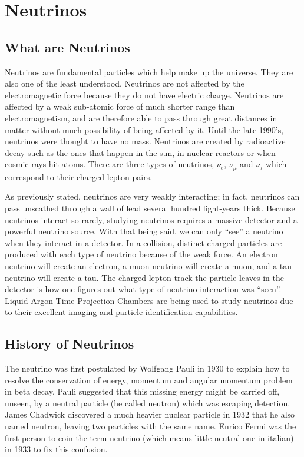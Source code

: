 \chapter{Neutrinos}\label{ch:neutrinos}

\section{What are Neutrinos}
Neutrinos are fundamental particles which help make up the universe. They are also one of the least understood. Neutrinos are not affected by the electromagnetic force because they do not have electric charge. Neutrinos are affected by a weak sub-atomic force of much shorter range than electromagnetism, and are therefore able to pass through great distances in matter without much possibility of being affected by it. Until the late 1990's, neutrinos were thought to have no mass. Neutrinos are created by radioactive decay such as the ones that happen in the sun, in nuclear reactors or when cosmic rays hit atoms. There are three types of neutrinos, $\nu_{e}$, $\nu_{\mu}$ and $\nu_{\tau}$ which correspond to their charged lepton pairs.  

As previously stated, neutrinos are very weakly interacting; in fact, neutrinos can pass unscathed through a wall of lead several hundred light-years thick. Because neutrinos interact so rarely, studying neutrinos requires a massive detector and a powerful neutrino source. With that being said, we can only ``see'' a neutrino when they interact in a detector. In a collision, distinct charged particles are produced with each type of neutrino because of the weak force. An electron neutrino will create an electron, a muon neutrino will create a muon, and a tau neutrino will create a tau. The charged lepton track the particle leaves in the detector is how one figures out what type of neutrino interaction was ``seen''. Liquid Argon Time Projection Chambers are being used to study neutrinos due to their excellent imaging and particle identification capabilities. 

\section{History of Neutrinos}
The neutrino was first postulated by Wolfgang Pauli in 1930 to explain how to resolve the conservation of energy, momentum and angular momentum problem in beta decay. Pauli suggested that this missing energy might be carried off, unseen, by a neutral particle (he called neutron) which was escaping detection. James Chadwick discovered a much heavier nuclear particle in 1932 that he also named neutron, leaving two particles with the same name. Enrico Fermi was the first person to coin the term neutrino (which means little neutral one in italian) in 1933 to fix this confusion. 

